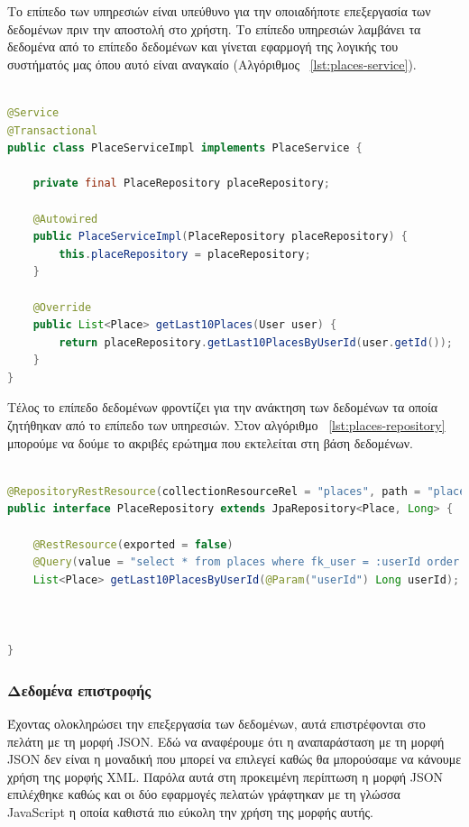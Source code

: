 Το επίπεδο των υπηρεσιών είναι υπεύθυνο για την οποιαδήποτε επεξεργασία των δεδομένων πριν την αποστολή στο χρήστη. Το επίπεδο υπηρεσιών λαμβάνει τα δεδομένα από το επίπεδο δεδομένων και γίνεται εφαρμογή της λογικής του συστήματός μας όπου αυτό είναι αναγκαίο (Αλγόριθμος ~\ref{lst:places-service}).

\begin{lstlisting}[language=Java, caption=Επίπεδο υπηρεσιών εξυπηρετητή, label={lst:places-service}]
    
@Service
@Transactional
public class PlaceServiceImpl implements PlaceService {

    private final PlaceRepository placeRepository;

    @Autowired
    public PlaceServiceImpl(PlaceRepository placeRepository) {
        this.placeRepository = placeRepository;
    }

    @Override
    public List<Place> getLast10Places(User user) {
        return placeRepository.getLast10PlacesByUserId(user.getId());
    }
}

\end{lstlisting}

Τέλος το επίπεδο δεδομένων φροντίζει για την ανάκτηση των δεδομένων τα οποία ζητήθηκαν από το επίπεδο των υπηρεσιών. Στον αλγόριθμο ~\ref{lst:places-repository} μπορούμε να δούμε το ακριβές ερώτημα που εκτελείται στη βάση δεδομένων.

\begin{lstlisting}[language=Java, caption=Επίπεδο δεδομένων εξυπηρετητή, label={lst:places-repository}]
    
@RepositoryRestResource(collectionResourceRel = "places", path = "places")
public interface PlaceRepository extends JpaRepository<Place, Long> {

    @RestResource(exported = false)
    @Query(value = "select * from places where fk_user = :userId order by  timestamp desc limit 10", nativeQuery = true)
    List<Place> getLast10PlacesByUserId(@Param("userId") Long userId);
    
    

}


\end{lstlisting}

\subsubsection{Δεδομένα επιστροφής}
Έχοντας ολοκληρώσει την επεξεργασία των δεδομένων, αυτά επιστρέφονται στο πελάτη με τη μορφή JSON. Εδώ να αναφέρουμε ότι η αναπαράσταση με τη μορφή JSON δεν είναι η μοναδική που μπορεί να επιλεγεί καθώς θα μπορούσαμε να κάνουμε χρήση της μορφής XML. Παρόλα αυτά στη προκειμένη περίπτωση η μορφή JSON επιλέχθηκε καθώς και οι δύο εφαρμογές πελατών γράφτηκαν με τη γλώσσα JavaScript η οποία καθιστά πιο εύκολη την χρήση της μορφής αυτής.

